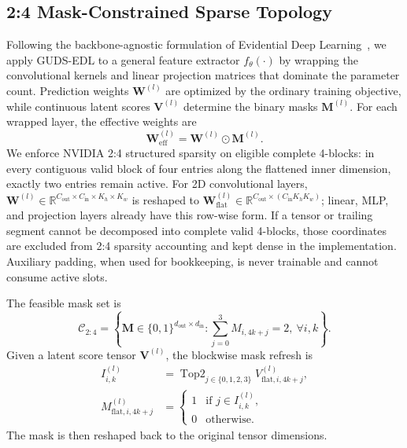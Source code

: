 \documentclass[letterpaper]{article} %
\newcommand{\R}{\mathbb{R}}
\DeclareMathOperator{\TopTwo}{Top2}
\begin{document}
\subsection{2:4 Mask-Constrained Sparse Topology}
Following the backbone-agnostic formulation of Evidential Deep Learning~\cite{sensoy2018evidential}, we apply GUDS-EDL to a general feature extractor $f_\theta(\cdot)$ by wrapping the convolutional kernels and linear projection matrices that dominate the parameter count. Prediction weights $\bm{W}^{(l)}$ are optimized by the ordinary training objective, while continuous latent scores $\bm{V}^{(l)}$ determine the binary masks $\bm{M}^{(l)}$. For each wrapped layer, the effective weights are
\begin{equation}\label{eq:wrapped_weights}
    \bm{W}_{\text{eff}}^{(l)}=\bm{W}^{(l)}\odot\bm{M}^{(l)} .
\end{equation}
We enforce NVIDIA 2:4 structured sparsity on eligible complete 4-blocks: in every contiguous valid block of four entries along the flattened inner dimension, exactly two entries remain active. For 2D convolutional layers, $\bm{W}^{(l)} \in \R^{C_{\text{out}}\times C_{\text{in}}\times K_h\times K_w}$ is reshaped to $\bm{W}_{\text{flat}}^{(l)}\in\R^{C_{\text{out}}\times (C_{\text{in}}K_hK_w)}$; linear, MLP, and projection layers already have this row-wise form. If a tensor or trailing segment cannot be decomposed into complete valid 4-blocks, those coordinates are excluded from 2:4 sparsity accounting and kept dense in the implementation. Auxiliary padding, when used for bookkeeping, is never trainable and cannot consume active slots.

The feasible mask set is
\begin{equation}\label{eq:c24}
    \mathcal{C}_{2:4}
    =
    \left\{
    \bm{M}\in\{0,1\}^{d_{\text{out}}\times d_{\text{in}}}:
    \sum_{j=0}^{3} M_{i,4k+j}=2,\ \forall i,k
    \right\}.
\end{equation}
Given a latent score tensor $\bm{V}^{(l)}$, the blockwise mask refresh is
\begin{equation}\label{eq:mask}
    \begin{aligned}
    I_{i,k}^{(l)} &= \TopTwo_{j\in\{0,1,2,3\}}
    V_{\text{flat},i,4k+j}^{(l)},\\
    M_{\text{flat},i,4k+j}^{(l)} &=
    \begin{cases}
        1 & \text{if } j\in I_{i,k}^{(l)},\\
        0 & \text{otherwise.}
    \end{cases}
    \end{aligned}
\end{equation}
The mask is then reshaped back to the original tensor dimensions.
\end{document}
